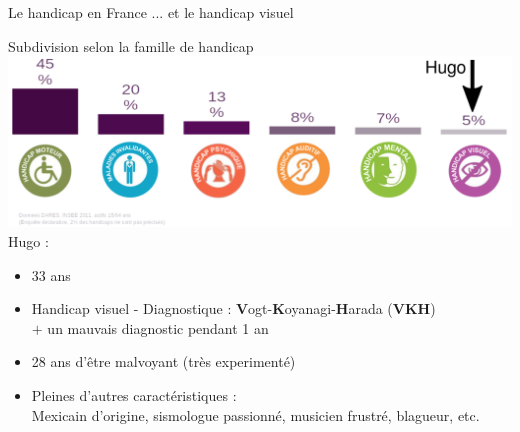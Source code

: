 \documentclass{beamer}
\begin{document}
\begin{frame}
 {Le handicap en France ... et le handicap visuel } 

 \vskip -0.2cm \small Subdivision selon la famille de handicap \\
 \vskip 0.1cm
    \includegraphics[width=1\linewidth]{images/handicaps.png} \\
\vskip -0.5cm Hugo : \pause
\vskip -0.2cm \begin{itemize}
 \item 33 ans \pause
 \item Handicap visuel - Diagnostique : \textbf{V}ogt-\textbf{K}oyanagi-\textbf{H}arada (\textbf{VKH}) \\
 \pause $+$ un mauvais diagnostic pendant 1 an \pause
 \item 28 ans d'être malvoyant (très experimenté) \pause 
 \item Pleines d'autres caractéristiques : \\ \pause 
       Mexicain d'origine, sismologue passionné, musicien frustr\'e, blagueur, etc.
\end{itemize}


 
\end{frame}
\end{document}
